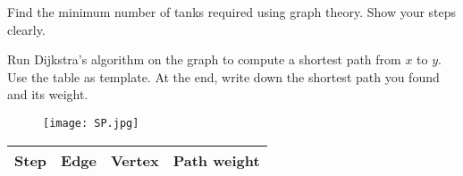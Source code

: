 \documentclass[letterpaper,9pt,addpoints]{exam}
\begin{document}
\begin{questions}

 Find the minimum number of tanks required using graph theory. Show your steps clearly.

 \newpage



\question[25]
Run Dijkstra's algorithm on the graph to compute a shortest path from $x$ to $y$. Use the table as template. At the end, write down the shortest path you found and its weight.
\begin{figure}[h] %
  \center
  \texttt{[image: SP.jpg]}
  \end{figure}
\begin{table}[h]
  \centering
\begin{tabular}{p{}p{}p{}p{}}
Step& Edge& Vertex& Path weight\\
\hline 
\end{tabular}
\end{table}



\end{questions}
\end{document}
